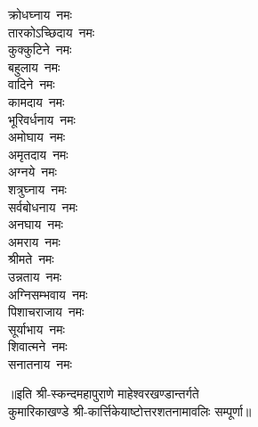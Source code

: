 \begin{multicols}{2}
\begin{flushleft}
क्रोधघ्नाय~नमः\\
तारकोऽच्छिदाय~नमः\\
कुक्कुटिने~नमः\hfill{}\\
बहुलाय~नमः\\
वादिने~नमः\\
कामदाय~नमः\\
भूरिवर्धनाय~नमः\\
अमोघाय~नमः\\
अमृतदाय~नमः\\
अग्नये~नमः\\
शत्रुघ्नाय~नमः\\
सर्वबोधनाय~नमः\\
अनघाय~नमः\hfill{}\\
अमराय~नमः\\
श्रीमते~नमः\\
उन्नताय~नमः\\
अग्निसम्भवाय~नमः\\
पिशाचराजाय~नमः\\
सूर्याभाय~नमः\\
शिवात्मने~नमः\\
सनातनाय~नमः\\
\end{flushleft}
\end{multicols}
॥इति श्री-स्कन्दमहापुराणे माहेश्वरखण्डान्तर्गते\\ कुमारिकाखण्डे श्री-कार्त्तिकेयाष्टोत्तरशतनामावलिः सम्पूर्णा॥
